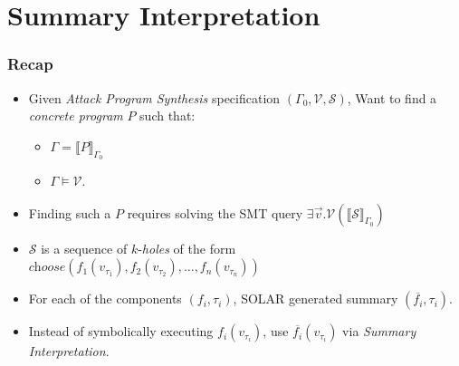 \documentclass{beamer}
\newcommand{\hole}{\textit{choose}}
\newcommand{\vect}[1]{\overrightarrow{#1}}
\begin{document}
\section{Summary Interpretation}
\begin{frame}
  \frametitle{Recap}
  \begin{itemize}
    \item Given \textit{Attack Program Synthesis} specification $(\Gamma_0, \mathcal{V}, \mathcal{S})$,
      Want to find a \textit{concrete program} $P$ such that:
      \begin{itemize}
        \item $\Gamma = \llbracket P \rrbracket_{\Gamma_0}$
        \item $\Gamma \vDash \mathcal{V}$.
      \end{itemize}
      \item Finding such a $P$ requires solving the SMT query $\exists \vect{v} .
        \mathcal{V}(\llbracket \mathcal{S} \rrbracket_{\Gamma_0})$
      \item $\mathcal{S}$ is a sequence of $k$-\textit{holes} of the form
        $\hole(f_1(v_{\tau_1}), f_2(v_{\tau_2}), \dots, f_n(v_{\tau_n}))$
    \item For each of the components $(f_i, \tau_i)$, SOLAR generated
      summary $(\overline{f_i}, \tau_i)$.
    \item Instead of symbolically executing $f_i(v_{\tau_i})$, use
      $\overline{f_i}(v_{\tau_i})$ via \textit{Summary Interpretation}.
  \end{itemize}
\end{frame}
\end{document}
